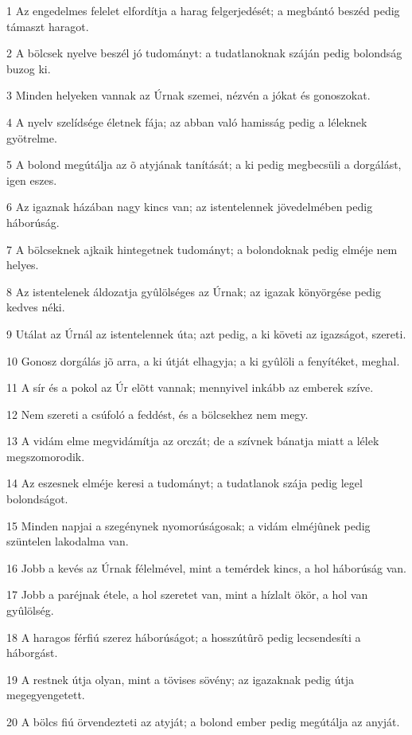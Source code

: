 \par 1 Az engedelmes felelet elfordítja a harag felgerjedését; a megbántó beszéd pedig támaszt haragot.
\par 2 A bölcsek nyelve beszél jó tudományt: a tudatlanoknak száján pedig bolondság buzog ki.
\par 3 Minden helyeken vannak az Úrnak szemei, nézvén a jókat és gonoszokat.
\par 4 A nyelv szelídsége életnek fája; az abban való hamisság pedig a léleknek gyötrelme.
\par 5 A bolond megútálja az õ atyjának tanítását; a ki pedig megbecsüli a dorgálást, igen eszes.
\par 6 Az igaznak házában nagy kincs van; az istentelennek jövedelmében pedig háborúság.
\par 7 A bölcseknek ajkaik hintegetnek tudományt; a bolondoknak pedig elméje nem helyes.
\par 8 Az istentelenek áldozatja gyûlölséges az Úrnak; az igazak könyörgése pedig kedves néki.
\par 9 Utálat az Úrnál az istentelennek úta; azt pedig, a ki követi az igazságot, szereti.
\par 10 Gonosz dorgálás jõ arra, a ki útját elhagyja; a ki gyûlöli a fenyítéket, meghal.
\par 11 A sír és a pokol az Úr elõtt vannak; mennyivel inkább az  emberek szíve.
\par 12 Nem szereti a csúfoló a feddést, és a bölcsekhez nem megy.
\par 13 A vidám elme megvidámítja az orczát; de a szívnek bánatja miatt a lélek megszomorodik.
\par 14 Az eszesnek elméje keresi a tudományt; a tudatlanok szája pedig legel bolondságot.
\par 15 Minden napjai a szegénynek nyomorúságosak; a vidám elméjûnek pedig szüntelen lakodalma van.
\par 16 Jobb a kevés az Úrnak félelmével, mint a temérdek kincs, a hol háborúság van.
\par 17 Jobb a paréjnak étele, a hol szeretet van, mint a hízlalt ökör, a hol van gyûlölség.
\par 18 A haragos férfiú szerez háborúságot; a hosszútûrõ pedig lecsendesíti a háborgást.
\par 19 A restnek útja olyan, mint a tövises sövény; az igazaknak pedig útja megegyengetett.
\par 20 A bölcs fiú örvendezteti az atyját; a bolond ember pedig megútálja az  anyját.
